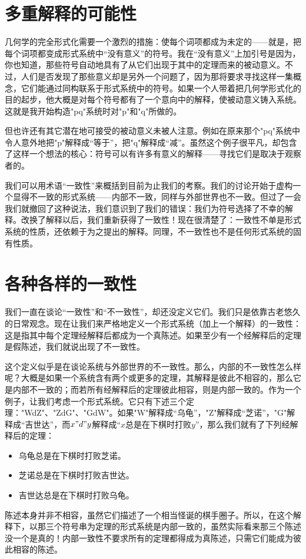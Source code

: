 \section{多重解释的可能性}

几何学的完全形式化需要一个激烈的措施：使每个词项都成为未定的——就是，把每个词项都变成形式系统中“没有意义”的符号。我在“没有意义”上加引号是因为，你也知道，那些符号自动地具有了从它们出现于其中的定理而来的被动意义。不过，人们是否发现了那些意义却是另外一个问题了，因为那将要求寻找这样一集概念，它们能通过同构联系于形式系统中的符号。如果一个人带着把几何学形式化的目的起步，他大概是对每个符号都有了一个意向中的解释，使被动意义铸入系统。这就是我开始构造"pq"系统时对"p"和"q"所做的。

但也许还有其它潜在地可接受的被动意义未被人注意。例如在原来那个"pq"系统中令人意外地把"p"解释成“等于”，把"q"解释成“减”。虽然这个例子很平凡，却包含了这样一个想法的核心：符号可以有许多有意义的解释——寻找它们是取决于观察者的。

我们可以用术语“一致性”来概括到目前为止我们的考察。我们的讨论开始于虚构一个显得不一致的形式系统——内部不一致，同样与外部世界也不一致。但过了一会我们就撤回了这种说法，我们意识到了我们的错误：我们为符号选择了不幸的解释。改换了解释以后，我们重新获得了一致性！现在很清楚了：一致性不单是形式系统的性质，还依赖于为之提出的解释。同理，不一致性也不是任何形式系统的固有性质。

\section{各种各样的一致性}

我们一直在谈论“一致性”和“不一致性”，却还没定义它们。我们只是依靠古老悠久的日常观念。现在让我们来严格地定义一个形式系统（加上一个解释）的一致性：这是指其中每个定理经解释后都成为一个真陈述。如果至少有一个经解释后的定理是假陈述，我们就说出现了不一致性。

这个定义似乎是在谈论系统与外部世界的不一致性。那么，内部的不一致性怎么样呢？大概是如果一个系统含有两个或更多的定理，其解释是彼此不相容的，那么它是内部不一致的；而若所有经解释后的定理彼此相容，则是内部一致的。作为一个例子，让我们考虑一个形式系统。它只有下述三个定理："WdZ"、"ZdG"、"GdW"。如果"W"解释成“乌龟”，"Z"解释成“芝诺”，"G"解释成“吉世达”，而$x"d"y$解释成“$x$总是在下棋时打败$y$”，那么我们就有了下列经解释后的定理：
\begin{itemize}
\item 乌龟总是在下棋时打败芝诺。
\item 芝诺总是在下棋时打败吉世达。
\item 吉世达总是在下棋时打败乌龟。
\end{itemize}
陈述本身并非不相容，虽然它们描述了一个相当怪诞的棋手圈子。所以，在这个解释下，以那三个符号串为定理的形式系统是内部一致的，虽然实际看来那三个陈述没一个是真的！内部一致性不要求所有的定理都得成为真陈述，只需它们能成为彼此相容的陈述。

